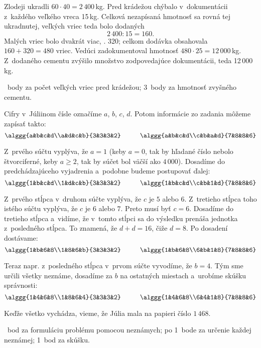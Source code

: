 {%
Zlodeji ukradli $60\cdot40=2\,400$\,kg.
Pred krádežou chýbalo v~dokumentácii z~každého veľkého vreca 15\,kg.
Celková nezapísaná hmotnosť sa rovná tej ukradnutej, veľkých vriec teda bolo
dodaných
$$
2\,400:15=160.
$$
Malých vriec bolo dvakrát viac, \tj. 320;
celkom dodávka obsahovala $160+320=480$ vriec.
Vedúci zadokumentoval hmotnosť $480\cdot25=12\,000$\,kg.
Z~dodaného cementu zvýšilo množstvo zodpovedajúce dokumentácii, teda
12\,000\,kg.

~body za počet veľkých vriec pred krádežou;
3~body za hmotnosť zvyšného cementu.
\endhodnotenie
}

{%
Cifry v~Júliinom čísle označíme $a$, $b$, $c$, $d$.
Potom informácie zo zadania môžeme zapísať takto:
$$
\alggg{a&b&c&d\\a&d&c&b}{3&3&3&2}
\hskip1cm
\alggg{a&b&c&d\\c&b&a&d}{7&8&8&6}
$$

Z~prvého súčtu vyplýva, že $a=1$
(keby $a=0$, tak by hľadané číslo nebolo štvorciferné,
keby $a\ge2$, tak by súčet bol väčší ako $4\,000$).
Dosadíme do predchádzajúceho vyjadrenia a~podobne budeme postupovať ďalej:
$$
\alggg{1&b&c&d\\1&d&c&b}{3&3&3&2}
\hskip1cm
\alggg{1&b&c&d\\c&b&1&d}{7&8&8&6}
$$

Z~prvého stĺpca v~druhom súčte vyplýva, že $c$ je $5$ alebo $6$.
Z~tretieho stĺpca toho istého súčtu vyplýva, že $c$ je $6$ alebo $7$.
Preto musí byť $c=6$.
Dosadíme do tretieho stĺpca a~vidíme, že v~tomto stĺpci sa do výsledku
prenáša jednotka z~posledného stĺpca.
To znamená, že $d+d=16$, čiže $d=8$.
Po dosadení dostávame:
$$
\alggg{1&b&6&8\\1&8&6&b}{3&3&3&2}
\hskip1cm
\alggg{1&b&6&8\\6&b&1&8}{7&8&8&6}
$$

Teraz napr. z~posledného stĺpca v~prvom súčte vyvodíme, že $b=4$.
Tým sme určili všetky neznáme, dosadíme za $b$ na ostatných miestach
a~urobíme skúšku správnosti:
$$
\alggg{1&4&6&8\\1&8&6&4}{3&3&3&2}
\hskip1cm
\alggg{1&4&6&8\\6&4&1&8}{7&8&8&6}
$$

Keďže všetko vychádza, vieme, že Júlia mala na papieri číslo
$1\,468$.

~bod za formuláciu problému pomocou neznámych;
po 1~bode za určenie každej neznámej;
1~bod za skúšku.
\endhodnotenie
}

